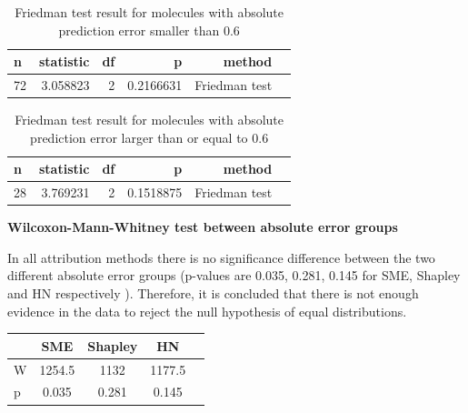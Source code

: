 \begin{center}
    \begin{table}[H]
        \caption{
Friedman test result for molecules with absolute prediction
error smaller than \(0.6\)}
\begin{tabular}{lrrrrl}
\toprule
 n & statistic & df & p & method \\
\midrule
 72 & 3.058823 & 2 & 0.2166631 & Friedman test \\
\bottomrule
\end{tabular}
\end{table}
\end{center}




\begin{center}
    \begin{table}[H]
        \caption{
Friedman test result for molecules with absolute prediction
error larger than or equal to \(0.6\)}
\begin{tabular}{lrrrrl}
\toprule
n & statistic & df & p & method \\
\midrule
28 & 3.769231 & 2 & 0.1518875 & Friedman test \\
\bottomrule
\end{tabular}
\end{table}
\end{center}


\textbf{Wilcoxon-Mann-Whitney test between absolute error groups}


In all attribution methods there is no significance difference between the two different
absolute error groups (p-values are 0.035, 0.281, 0.145 for SME, Shapley
and HN respectively ). Therefore, it is concluded that there is not enough evidence in
the data to reject the null hypothesis of equal distributions.

\begin{center}
    \begin{table}[H]
        \begin{tabular}{lcccl}
            \toprule
            &SME & Shapley & HN \\
            \midrule 
        W & 1254.5 & 1132 &  1177.5 \\
        p &  0.035 & 0.281 & 0.145 \\
        \bottomrule
    \end{tabular}
\end{table}
\end{center}
